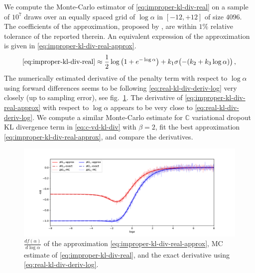 \documentclass[a4paper,10pt,onecolumn]{article}
\newcommand{\cplx}{\mathbb{C}}
\begin{document}
We compute the Monte-Carlo estimator of \eqref{eq:improper-kl-div-real} on a sample of $10^7$
draws over an equally spaced grid of $\log \alpha$ in $[-12, +12]$ of size $4096$. The
coefficients of the approximation, proposed by \citet{molchanov_variational_2017}, are
within $1\%$ relative tolerance of the reported therein. An equivalent expression of the
approximation is given in \eqref{eq:improper-kl-div-real-approx}.
\begin{equation}  \label{eq:improper-kl-div-real-approx}
  \eqref{eq:improper-kl-div-real}
  \approx
    \frac12 \log{\bigl(1 + e^{-\log \alpha}\bigr)}
    + k_1 \sigma\bigl(- (k_2 + k_3 \log \alpha)\bigr)
  \,,
\end{equation}
The numerically estimated derivative of the penalty term with respect to $\log \alpha$ using
forward differences seems to be following \eqref{eq:real-kl-div-deriv-log} very closely (up to
sampling error), see fig.~\ref{fig:molchanov-derivative-replica}. The derivative of
\eqref{eq:improper-kl-div-real-approx} with respect to $\log \alpha$ appears to be very close
to \eqref{eq:real-kl-div-deriv-log}. We compute a similar Monte-Carlo estimate for
$\cplx$ variational dropout KL divergence term in \eqref{eq:c-vd-kl-div} with $\beta = 2$,
fit the best approximation \eqref{eq:improper-kl-div-real-approx}, and compare the derivatives.

\begin{figure}[!t]
  \centering
  \includegraphics[width=\columnwidth]{grad_log.pdf}
  \caption{$\tfrac{d f(\alpha)}{d \log{\alpha}}$ of the approximation
  \eqref{eq:improper-kl-div-real-approx}, MC estimate of \eqref{eq:improper-kl-div-real},
  and the exact derivative using \eqref{eq:real-kl-div-deriv-log}.}
  \label{fig:molchanov-derivative-replica}
\end{figure}
\end{document}
